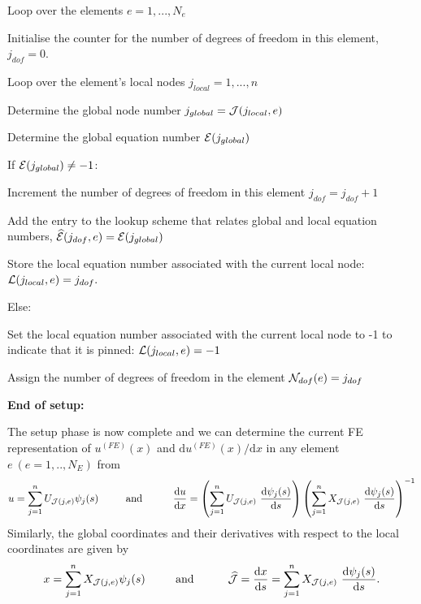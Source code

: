 \begin{DoxyItemize}
\item Loop over the elements $ e=1,...,N_e $
\begin{DoxyItemize}
\item Initialise the counter for the number of degrees of freedom in this element, $ j_{dof}=0 $.
\item Loop over the element's local nodes $ j_{local}=1,...,n$
\begin{DoxyItemize}
\item Determine the global node number $ j_{global} = {\cal J}(j_{local},e) $
\item Determine the global equation number ${\cal E}(j_{global})$
\item If ${\cal E}(j_{global}) \ne -1$\-:
\begin{DoxyItemize}
\item Increment the number of degrees of freedom in this element $ j_{dof}=j_{dof}+1$
\item Add the entry to the lookup scheme that relates global and local equation numbers, $ \widehat{\cal E}(j_{dof},e) = {\cal E}(j_{global})$
\item Store the local equation number associated with the current local node\-: $ {\cal L}(j_{local},e)=j_{dof}.$
\end{DoxyItemize}
\item Else\-:
\begin{DoxyItemize}
\item Set the local equation number associated with the current local node to -\/1 to indicate that it is pinned\-: $ {\cal L}(j_{local},e)=-1$
\end{DoxyItemize}
\end{DoxyItemize}
\item Assign the number of degrees of freedom in the element $ {\cal N}_{dof}(e)=j_{dof} $
\end{DoxyItemize}

{\bfseries  End of setup\-:}

The setup phase is now complete and we can determine the current F\-E representation of $ u^{(FE)}(x)$ and $ \mbox{d} u^{(FE)}(x)/\mbox{d} x$ in any element $e \ (e=1,..,N_E) $ from \[ u = \sum_{j=1}^{n} U_{{\cal J}(j,e)} \psi_j(s) \mbox{\ \ \ \ \ \ \ \ and \ \ \ \ \ \ \ \ } \frac{\mbox{d} u}{\mbox{d} x} = \left(\sum_{j=1}^n U_{{\cal J}(j,e)} \ \frac{\mbox{d} \psi_j(s)}{\mbox{d} s} \right) \left(\sum_{j=1}^n X_{{\cal J}(j,e)} \ \frac{\mbox{d} \psi_j(s)}{\mbox{d} s} \right)^{-1} \] Similarly, the global coordinates and their derivatives with respect to the local coordinates are given by \[ x = \sum_{j=1}^{n} X_{{\cal J}(j,e)} \psi_j(s) \mbox{\ \ \ \ \ \ \ \ and \ \ \ \ \ \ \ \ } \widehat{\cal J} = \frac{\mbox{d} x}{\mbox{d} s} = \sum_{j=1}^n X_{{\cal J}(j,e)} \ \frac{\mbox{d} \psi_j(s)}{\mbox{d} s}. \]


\end{DoxyItemize}
